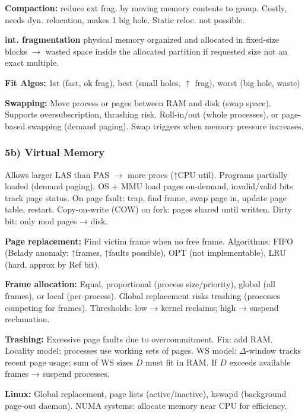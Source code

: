 \textbf{Compaction:} reduce ext frag. by moving memory contents to group. Costly, needs dyn. relocation, makes 1 big hole. Static reloc. not possible.

\textbf{int. fragmentation}
physical memory organized and allocated in fixed-size blocks $\to$ wasted space inside the allocated partition if requested size not an exact multiple.

\textbf{Fit Algos:} 1st (fast, ok frag), best (small holes, $\uparrow$ frag), worst (big hole, waste)

\textbf{Swapping:} Move process or pages between RAM and disk (swap space). Supports oversubscription, thrashing risk. Roll-in/out (whole processes), or page-based swapping (demand paging). Swap triggers when memory pressure increases.

\subsubsection*{5b) Virtual Memory}
Allows larger LAS than PAS $\to$ more procs (↑CPU util). Programs partially loaded (demand paging). OS + MMU load pages on-demand, invalid/valid bits track page status. On page fault: trap, find frame, swap page in, update page table, restart. Copy-on-write (COW) on fork: pages shared until written.
Dirty bit: only mod pages → disk.

\textbf{Page replacement:} Find victim frame when no free frame. Algorithms: FIFO (Belady anomaly: ↑frames, ↑faults possible), OPT (not implementable), LRU (hard, approx by Ref bit).

\textbf{Frame allocation:} Equal, proportional (process size/priority), global (all frames), or local (per-process). Global replacement risks trashing (processes competing for frames). Thresholds: low → kernel reclaims; high → suspend reclamation.

\textbf{Trashing:} Excessive page faults due to overcommitment. Fix: add RAM. Locality model: processes use working sets of pages. WS model: \(\Delta\)-window tracks recent page usage; sum of WS sizes \(D\) must fit in RAM. If \(D\) exceeds available frames → suspend processes.

\textbf{Linux:} Global replacement, page lists (active/inactive), kswapd (background page-out daemon). NUMA systems: allocate memory near CPU for efficiency.
